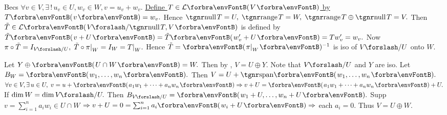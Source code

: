 \BulletPointX\NoteFor{[3.88, 3.90, 3.91]}\;\TextB{}
{Becs $\forall v\in V,\exists\,!\,u_v\in U,w_v\in W,v=u_v+w_v.$ \uline{Define $T\in\Lm{V}$ by $T\Par{v}=w_v.$}}\TextB{}
{Hence $\null T=U,\;\range T=W,\;\range T\oplus\null T=V.$}\TextB{}
{Then $\tilde{T}\in\Lm{V\XSlash \null T,V}$ is defined by $\tilde{T}\Par{v+U}=\tilde{T}\Par{w_v'+U}=Tw_v'=w_v.$ \FontSmall{}}\TextB{}
{Now $\pi\circ\tilde{T}=I_{V\XSlash U},\;\tilde{T}\circ\pi\mmid_W=I_{W}=T\mmid_W.$ \;Hence $\tilde{T}=\Par{\pi\mmid_W}{^{-1}}$ is iso of $V\XSlash U$ onto $W.$}\par\vspace{2pt}
\SepLine

Let $Y\oplus\Par{U\cap W}=W.$ Then by , $V=U\oplus Y.$ Note that $V\XSlash U$ and $Y$ are iso.\PfEnd\parSol{\vspace{2pt}}
\Or Let $B_W=\Par{w_1,\dots,w_n}.$ Then $V=U+\Span{w_1,\dots,w_n}.$\parSol{}
$\forall v\in V,\exists\,u\in U,\;v=u+\Par{a_1w_1+\dots+a_nw_n}\Rightarrow v+U=\Par{a_1w_1+\dots+a_nw_n}+U.$\PfEnd\vspace{2pt}
\ANote If $\dim W=\dim V\XSlash U.$ Then $B_{V\XSlash U}=\Par{w_1+U,\dots,w_n+U}.$ Supp $v=\sum_{i=1}^na_iw_i\in U\cap W$\parNot
$\Rightarrow v+U=0=\sum_{i=1}^na_i\Par{w_i+U}\Rightarrow$ each $a_i=0.$ Thus $V=U\oplus W.$
\SepLine

